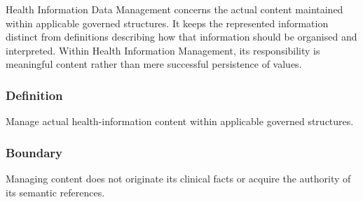 Health Information Data Management concerns the actual content maintained within applicable governed structures. It keeps the represented information distinct from definitions describing how that information should be organised and interpreted. Within Health Information Management, its responsibility is meaningful content rather than mere successful persistence of values.

\subsubsection*{Definition}

Manage actual health-information content within applicable governed structures.

\subsubsection*{Boundary}

Managing content does not originate its clinical facts or acquire the authority of its semantic references.

